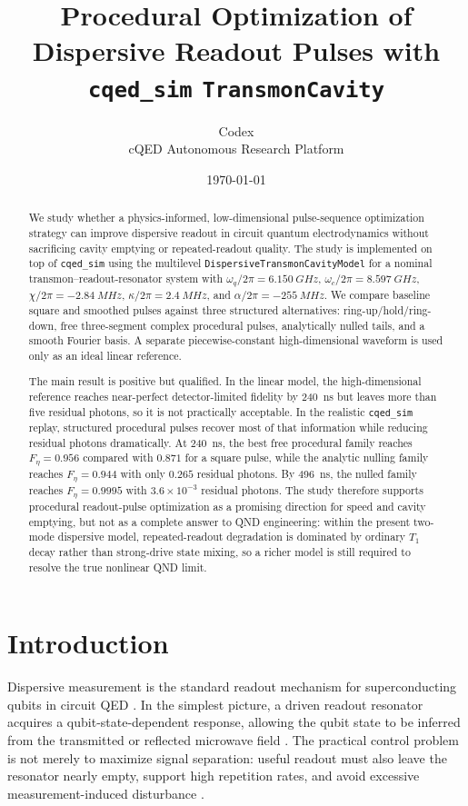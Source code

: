 \documentclass[11pt, a4paper]{article}
\title{\textbf{Procedural Optimization of Dispersive Readout Pulses with \texttt{cqed\_sim} \texttt{TransmonCavity}}}
\author{Codex \\ cQED Autonomous Research Platform}
\date{\today}
\begin{document}
\maketitle

\begin{abstract}
We study whether a physics-informed, low-dimensional pulse-sequence optimization strategy
can improve dispersive readout in circuit quantum electrodynamics without sacrificing
cavity emptying or repeated-readout quality. The study is implemented on top of
\texttt{cqed\_sim} using the multilevel \texttt{DispersiveTransmonCavityModel} for a
nominal transmon--readout-resonator system with
$\omega_q/2\pi=\SI{6.150}{GHz}$, $\omega_c/2\pi=\SI{8.597}{GHz}$,
$\chi/2\pi=\SI{-2.84}{MHz}$, $\kappa/2\pi=\SI{2.4}{MHz}$, and
$\alpha/2\pi=\SI{-255}{MHz}$. We compare baseline square and smoothed pulses against
three structured alternatives: ring-up/hold/ring-down, free three-segment complex
procedural pulses, analytically nulled tails, and a smooth Fourier basis. A separate
piecewise-constant high-dimensional waveform is used only as an ideal linear reference.

The main result is positive but qualified. In the linear model, the high-dimensional
reference reaches near-perfect detector-limited fidelity by \SI{240}{ns} but leaves
more than five residual photons, so it is not practically acceptable. In the realistic
\texttt{cqed\_sim} replay, structured procedural pulses recover most of that information
while reducing residual photons dramatically. At \SI{240}{ns}, the best free procedural
family reaches $F_\eta=0.956$ compared with $0.871$ for a square pulse, while the
analytic nulling family reaches $F_\eta=0.944$ with only $0.265$ residual photons. By
\SI{496}{ns}, the nulled family reaches $F_\eta=0.9995$ with $3.6\times10^{-3}$ residual
photons. The study therefore supports procedural readout-pulse optimization as a
promising direction for speed and cavity emptying, but not as a complete answer to QND
engineering: within the present two-mode dispersive model, repeated-readout degradation is
dominated by ordinary $T_1$ decay rather than strong-drive state mixing, so a richer model
is still required to resolve the true nonlinear QND limit.
\end{abstract}

\section{Introduction}
Dispersive measurement is the standard readout mechanism for superconducting qubits in
circuit QED \cite{blais2021circuit,koch2007transmon}. In the simplest picture, a driven
readout resonator acquires a qubit-state-dependent response, allowing the qubit state to
be inferred from the transmitted or reflected microwave field
\cite{gambetta2007protocols,boissonneault2009dispersive}. The practical control problem is
not merely to maximize signal separation: useful readout must also leave the resonator
nearly empty, support high repetition rates, and avoid excessive measurement-induced
disturbance \cite{jeffrey2014fast,walter2017rapid,sank2016measurement}.
\end{document}
